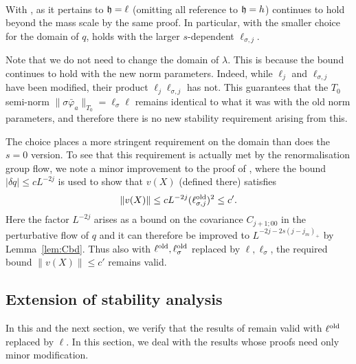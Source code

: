 \paragraph{\cite[Proposition~\ref{IE-prop:monobd}]{BS-rg-IE}}
With , \cite[Proposition~\ref{IE-prop:monobd}]{BS-rg-IE}
as it pertains to $\mathfrak{h}=\ell$ (omitting all reference to $\mathfrak{h}=h$) continues to hold beyond
the mass scale by the same proof.
In particular, with the smaller choice for the domain of $q$,
\cite[\eqref{IE-e:qhsig}]{BS-rg-IE} holds with the larger $s$-dependent $\ell_{\sigma,j}$.

\medskip
Note that we do not need to change the domain of $\lambda$.
This is because the bound \cite[\eqref{IE-e:hsigh}]{BS-rg-IE}
continues to hold with the new norm parameters. Indeed, while $\ell_j$
and $\ell_{\sigma,j}$ have been modified, their product $\ell_j \ell_{\sigma,j}$
has not.
This guarantees that the $T_0$ semi-norm
$\|\sigma\bar\varphi_a\|_{T_0} = \ell_\sigma \ell$ remains identical to what it was
with the old norm parameters, and therefore there is no new stability requirement
arising from this.

The choice  places a more stringent requirement on the domain
than does the $s=0$ version.  To see that this requirement is actually met
by the renormalisation group flow,
we note a minor improvement to the proof of \cite[Lemma~\ref{step-lem:K7a}(ii)]{BS-rg-step},
where the bound $|\delta q| \leq c L^{-2j}$ is used to show that $v(X)$
(defined there) satisfies
\begin{equation}
\lbeq{vXbd}
\|v(X)\| \leq c L^{-2j} (\ell_{\sigma,j}^\oldrm)^2 \leq c'.
\end{equation}
Here the factor $L^{-2j}$ arises
as a bound on the covariance $C_{j+1;00}$ in the perturbative flow
\cite[\eqref{pt-e:qpt2}]{BS-rg-IE} of $q$ and it can therefore be improved to $L^{-2j-2s(j - j_m)_+}$
by Lemma~\ref{lem:Cbd}.
Thus also with $\ell^{\mathrm{old}}, \ell_{\sigma}^{\rm old}$ replaced by $\ell,\ell_{\sigma}$,
the required bound $\|v(X)\| \leq c'$ remains valid.


\subsection{Extension of stability analysis}
\label{sec:stability2}

In this and the next section,
we verify that the results of \cite[Section~\ref{IE-sec:IE}]{BS-rg-IE}
remain valid with $\ell^{\mathrm{old}}$ replaced by $\ell$.
In this section, we deal with the results whose proofs need only minor
modification.

